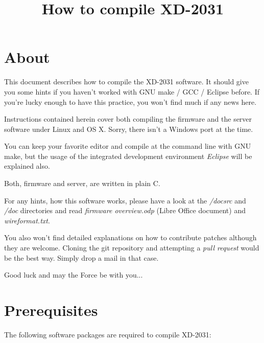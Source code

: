 


\newcommand{\screenshot}[2][scale=0.5]{ 
	\begin{center} 
	\includegraphics [ #1 ] {images/#2} 
	\end{center}  
}

\newcommand{\clickhere}[1]{\textit{#1}}
\newcommand{\typethis}[1]{\textbf{#1}}

\title{How to compile XD-2031}
\author{}
\maketitle
\clearpage

\tableofcontents
\clearpage

\section{About}
This document describes how to compile the XD-2031 software. 
It should give you some hints if you haven't worked with 
GNU make / GCC / Eclipse
before. If you're lucky enough to have this practice, you won't find
much if any news here.

Instructions contained herein cover both compiling the firmware and the
server software under Linux and OS X. Sorry, there isn't a Windows port 
at the time.

You can keep your favorite editor and compile at the command line with 
GNU make, but the usage of the integrated development environment 
\textit{Eclipse} will be explained also.

Both, firmware and server, are written in plain C.

For any hints, how this software works,
please have a look at the \textit{/docsrc} 
and \textit{/doc} directories and read \textit{firmware overview.odp} 
(Libre Office document) and \textit{wireformat.txt}.

You also won't find detailed explanations on how to contribute patches although
they are welcome. Cloning the git repository and attempting a 
\textit{pull request} would be the best way. Simply drop a mail in that case.

Good luck and may the Force be with you...

\section{Prerequisites}

The following software packages are required to compile XD-2031:

